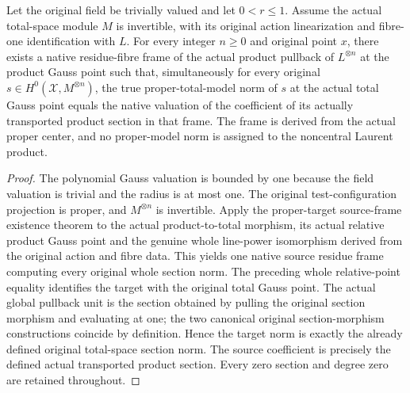 \begin{theorem}\label{thm:native-tc-product-frame-true-norm}
\leanok
Let the original field be trivially valued and let $0<r\leq1$.
Assume the actual total-space module $M$ is invertible, with its
original action linearization and fibre-one identification with $L$.
For every integer $n\geq0$ and original point $x$, there exists a
native residue-fibre frame of the actual product pullback of
$L^{\otimes n}$ at the product Gauss point such that, simultaneously
for every original $s\in H^0(\mathcal X,M^{\otimes n})$, the true
proper-total-model norm of $s$ at the actual total Gauss point equals
the native valuation of the coefficient of its actually transported
product section in that frame. The frame is derived from the actual
proper center, and no proper-model norm is assigned to the noncentral
Laurent product.
\end{theorem}
\begin{proof}
The polynomial Gauss valuation is bounded by one because the field
valuation is trivial and the radius is at most one. The original
test-configuration projection is proper, and $M^{\otimes n}$ is
invertible. Apply the proper-target source-frame existence theorem
to the actual product-to-total morphism, its actual relative product
Gauss point and the genuine whole line-power isomorphism derived
from the original action and fibre data. This yields one native
source residue frame computing every original whole section norm.
The preceding whole relative-point equality identifies the target
with the original total Gauss point. The actual global pullback unit
is the section obtained by pulling the original section morphism
and evaluating at one; the two canonical original section-morphism
constructions coincide by definition. Hence the target norm is
exactly the already defined original total-space section norm.
The source coefficient is precisely the defined actual
transported product section. Every zero section and degree zero are
retained throughout.
\end{proof}
